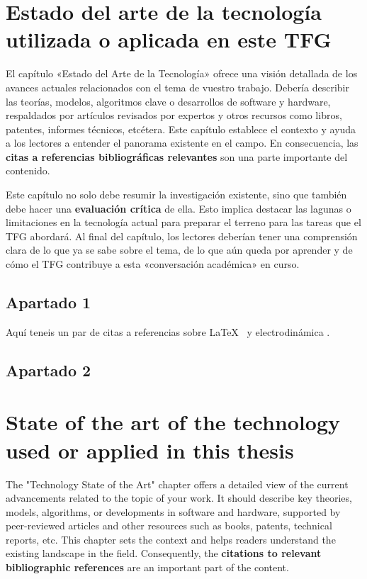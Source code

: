   \chapter[Estado del arte]{Estado del arte de la tecnología utilizada o aplicada en este TFG}

  El capítulo «Estado del Arte de la Tecnología» ofrece una visión detallada de los avances actuales relacionados con el tema de vuestro trabajo. Debería describir las teorías, modelos, algoritmos clave o desarrollos de software y hardware, respaldados por artículos revisados por expertos y otros recursos como libros, patentes, informes técnicos, etcétera. Este capítulo establece el contexto y ayuda a los lectores a entender el panorama existente en el campo. En consecuencia, las \textbf{citas a referencias bibliográficas relevantes} son una parte importante del contenido.
  
  Este capítulo no solo debe resumir la investigación existente, sino que también debe hacer una \textbf{evaluación crítica} de ella. Esto implica destacar las lagunas o limitaciones en la tecnología actual para preparar el terreno para las tareas que el TFG abordará. Al final del capítulo, los lectores deberían tener una comprensión clara de lo que ya se sabe sobre el tema, de lo que aún queda por aprender y de cómo el TFG contribuye a esta «conversación académica» en curso.

  \section{Apartado 1}

  Aquí teneis un par de citas a referencias sobre \LaTeX~\cite{latexcompanion} y electrodinámica \cite{einstein}.

  \section{Apartado 2}
  \lipsum[7]

\else
  \chapter[State of the art]{State of the art of the technology used or applied in this thesis}

  The "Technology State of the Art" chapter offers a detailed view of the current advancements related to the topic of your work. It should describe key theories, models, algorithms, or developments in software and hardware, supported by peer-reviewed articles and other resources such as books, patents, technical reports, etc. This chapter sets the context and helps readers understand the existing landscape in the field. Consequently, the \textbf{citations to relevant bibliographic references} are an important part of the content.
  
